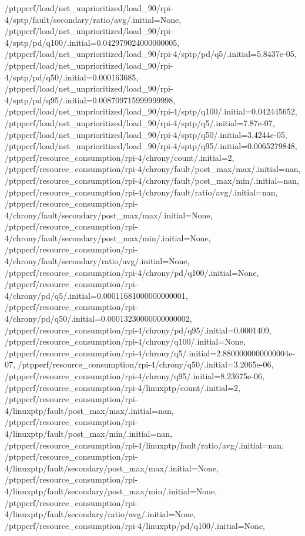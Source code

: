 {    /ptpperf/load/net_unprioritized/load_90/rpi-4/sptp/fault/secondary/ratio/avg/.initial=None,
    /ptpperf/load/net_unprioritized/load_90/rpi-4/sptp/pd/q100/.initial=0.042979024000000005,
    /ptpperf/load/net_unprioritized/load_90/rpi-4/sptp/pd/q5/.initial=5.8437e-05,
    /ptpperf/load/net_unprioritized/load_90/rpi-4/sptp/pd/q50/.initial=0.000163685,
    /ptpperf/load/net_unprioritized/load_90/rpi-4/sptp/pd/q95/.initial=0.008709715999999998,
    /ptpperf/load/net_unprioritized/load_90/rpi-4/sptp/q100/.initial=0.042445652,
    /ptpperf/load/net_unprioritized/load_90/rpi-4/sptp/q5/.initial=7.87e-07,
    /ptpperf/load/net_unprioritized/load_90/rpi-4/sptp/q50/.initial=3.4244e-05,
    /ptpperf/load/net_unprioritized/load_90/rpi-4/sptp/q95/.initial=0.0065279848,
    /ptpperf/resource_consumption/rpi-4/chrony/count/.initial=2,
    /ptpperf/resource_consumption/rpi-4/chrony/fault/post_max/max/.initial=nan,
    /ptpperf/resource_consumption/rpi-4/chrony/fault/post_max/min/.initial=nan,
    /ptpperf/resource_consumption/rpi-4/chrony/fault/ratio/avg/.initial=nan,
    /ptpperf/resource_consumption/rpi-4/chrony/fault/secondary/post_max/max/.initial=None,
    /ptpperf/resource_consumption/rpi-4/chrony/fault/secondary/post_max/min/.initial=None,
    /ptpperf/resource_consumption/rpi-4/chrony/fault/secondary/ratio/avg/.initial=None,
    /ptpperf/resource_consumption/rpi-4/chrony/pd/q100/.initial=None,
    /ptpperf/resource_consumption/rpi-4/chrony/pd/q5/.initial=0.00011681000000000001,
    /ptpperf/resource_consumption/rpi-4/chrony/pd/q50/.initial=0.00013230000000000002,
    /ptpperf/resource_consumption/rpi-4/chrony/pd/q95/.initial=0.0001409,
    /ptpperf/resource_consumption/rpi-4/chrony/q100/.initial=None,
    /ptpperf/resource_consumption/rpi-4/chrony/q5/.initial=2.8800000000000004e-07,
    /ptpperf/resource_consumption/rpi-4/chrony/q50/.initial=3.2065e-06,
    /ptpperf/resource_consumption/rpi-4/chrony/q95/.initial=8.23675e-06,
    /ptpperf/resource_consumption/rpi-4/linuxptp/count/.initial=2,
    /ptpperf/resource_consumption/rpi-4/linuxptp/fault/post_max/max/.initial=nan,
    /ptpperf/resource_consumption/rpi-4/linuxptp/fault/post_max/min/.initial=nan,
    /ptpperf/resource_consumption/rpi-4/linuxptp/fault/ratio/avg/.initial=nan,
    /ptpperf/resource_consumption/rpi-4/linuxptp/fault/secondary/post_max/max/.initial=None,
    /ptpperf/resource_consumption/rpi-4/linuxptp/fault/secondary/post_max/min/.initial=None,
    /ptpperf/resource_consumption/rpi-4/linuxptp/fault/secondary/ratio/avg/.initial=None,
    /ptpperf/resource_consumption/rpi-4/linuxptp/pd/q100/.initial=None,
}
